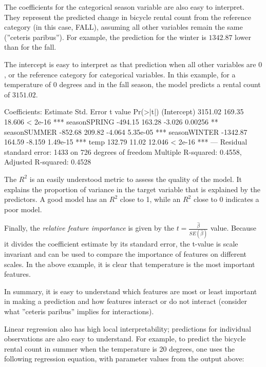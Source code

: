 The coefficients for the categorical season variable are also easy to interpret. They represent the predicted change in bicycle rental count from the reference category (in this case, FALL), assuming all other variables remain the same (''ceteris paribus''). For example, the prediction for the winter is $1342.87$ lower than for the fall.

The intercept is easy to interpret as that prediction when all other variables are $0$, or the reference category for categorical variables. In this example, for a temperature of 0 degrees and in the fall season, the model predicts a rental count of $3151.02$.

\begin{textcode}
Coefficients:
             Estimate Std. Error t value Pr(>|t|)    
(Intercept)   3151.02     169.35  18.606  < 2e-16 ***
seasonSPRING  -494.15     163.28  -3.026  0.00256 ** 
seasonSUMMER  -852.68     209.82  -4.064 5.35e-05 ***
seasonWINTER -1342.87     164.59  -8.159 1.49e-15 ***
temp           132.79      11.02  12.046  < 2e-16 ***
---
Residual standard error: 1433 on 726 degrees of freedom
Multiple R-squared: 0.4558, Adjusted R-squared: 0.4528 
\end{textcode}

The $R^2$ is an easily understood metric to assess the quality of the model. It explains the proportion of variance in the target variable that is explained by the predictors. A good model has an $R^2$ close to 1, while an $R^2$ close to 0 indicates a poor model. 

Finally, the \emph{relative feature importance} is given by the $t=\frac{\hat{\beta}}{SE(\hat{\beta})}$ value. Because it divides the coefficient estimate by its standard error, the t-value is scale invariant and can be used to compare the importance of features on different scales. In the above example, it is clear that temperature is the most important features.

In summary, it is easy to understand which features are most or least important in making a prediction and how features interact or do not interact (consider what ''ceteris paribus'' implies for interactions). 

Linear regression also has high local interpretability; predictions for individual observations are also easy to understand. For example, to predict the bicycle rental count in summer when the temperature is 20 degrees, one uses the following regression equation, with parameter values from the output above:

